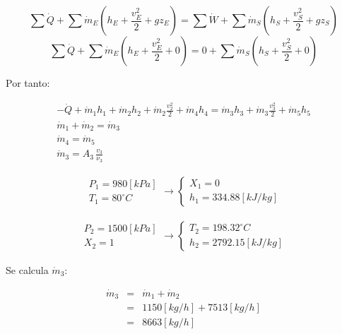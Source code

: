 \documentclass[letter,10pt]{article}
\begin{document}
\begin{enumerate}
\begin{equation*}
    \sum\dot{Q} + \sum\dot{m}_E (h_E + \frac{v^2_E}{2} + g z_E) =
    \sum\dot{W} + \sum\dot{m}_S (h_S + \frac{v^2_S}{2} + g z_S)
\end{equation*}
\begin{equation*}
    \sum\dot{Q} + \sum\dot{m}_E (h_E + \frac{v^2_E}{2} + 0)
    = 0 + \sum\dot{m}_S (h_S + \frac{v^2_S}{2} + 0)
\end{equation*}

Por tanto:

\begin{eqnarray*}
    -\dot{Q} + \dot{m}_1 h_1 + \dot{m}_2 h_2 + \dot{m}_2 \frac{v^2_2}{2}
    + \dot{m}_4 h_4
    = \dot{m}_3 h_3 + \dot{m}_3 \frac{v^2_3}{2} + \dot{m}_5 h_5 \\
    \dot{m}_1 + \dot{m}_2 = \dot{m}_3 \\
    \dot{m}_4 = \dot{m}_5 \\
    \dot{m}_3 = A_3\,\frac{v_3}{\nu_3}
\end{eqnarray*}

\begin{eqnarray*}
    \begin{array}{c}
        P_1 = 980[kPa] \\
        T_1 = 80^\circ C
    \end{array}
    \rightarrow
    \begin{cases}
        X_1 = 0 \\
        h_1 = 334.88[kJ/kg]
    \end{cases}
\end{eqnarray*}

\begin{eqnarray*}
    \begin{array}{c}
        P_2 = 1500[kPa] \\
        X_2 = 1
    \end{array}
    \rightarrow
    \begin{cases}
        T_2 = 198.32^\circ C \\
        h_2 = 2792.15[kJ/kg]
    \end{cases}
\end{eqnarray*}

Se calcula $\dot{m}_3$:

\begin{eqnarray*}
    \dot{m}_3 &=& \dot{m}_1 + \dot{m}_2 \\
              &=& 1150[kg/h] + 7513[kg/h] \\
              &=& 8663[kg/h]
\end{eqnarray*}


\end{enumerate}
\end{document}
